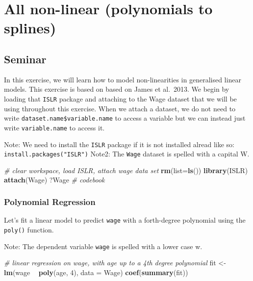 \documentclass[]{article}
\newenvironment{Shaded}{\begin{snugshade}}{\end{snugshade}}
\newcommand{\CommentTok}[1]{\textcolor[rgb]{0.56,0.35,0.01}{\textit{#1}}}
\newcommand{\DataTypeTok}[1]{\textcolor[rgb]{0.13,0.29,0.53}{#1}}
\newcommand{\DecValTok}[1]{\textcolor[rgb]{0.00,0.00,0.81}{#1}}
\newcommand{\KeywordTok}[1]{\textcolor[rgb]{0.13,0.29,0.53}{\textbf{#1}}}
\newcommand{\NormalTok}[1]{#1}
\newcommand{\OperatorTok}[1]{\textcolor[rgb]{0.81,0.36,0.00}{\textbf{#1}}}
\newcommand{\StringTok}[1]{\textcolor[rgb]{0.31,0.60,0.02}{#1}}
\begin{document}
\hypertarget{all-non-linear-polynomials-to-splines}{%
\section{All non-linear (polynomials to splines)}\label{all-non-linear-polynomials-to-splines}}

\hypertarget{seminar-4}{%
\subsection{Seminar}\label{seminar-4}}

In this exercise, we will learn how to model non-linearities in generalised linear models. This exercise is based on based on James et al.~2013. We begin by loading that \texttt{ISLR} package and attaching to the Wage dataset that we will be using throughout this exercise. When we attach a dataset, we do not need to write \texttt{dataset.name\$variable.name} to access a variable but we can instead just write \texttt{variable.name} to access it.

Note: We need to install the \texttt{ISLR} package if it is not installed alread like so: \texttt{install.packages("ISLR")}
Note2: The \texttt{Wage} dataset is spelled with a capital W.

\begin{Shaded}
\begin{Highlighting}[]
\CommentTok{# clear workspace, load ISLR, attach wage data set}
\KeywordTok{rm}\NormalTok{(}\DataTypeTok{list=}\KeywordTok{ls}\NormalTok{())}
\KeywordTok{library}\NormalTok{(ISLR)}
\KeywordTok{attach}\NormalTok{(Wage)}
\NormalTok{?Wage }\CommentTok{# codebook}
\end{Highlighting}
\end{Shaded}

\hypertarget{polynomial-regression}{%
\subsubsection{Polynomial Regression}\label{polynomial-regression}}

Let's fit a linear model to predict \texttt{wage} with a forth-degree polynomial using the \texttt{poly()} function.

Note: The dependent variable \texttt{wage} is spelled with a lower case w.

\begin{Shaded}
\begin{Highlighting}[]
\CommentTok{# linear regression on wage, with age up to a 4th degree polynomial}
\NormalTok{fit <-}\StringTok{ }\KeywordTok{lm}\NormalTok{(wage }\OperatorTok{~}\StringTok{ }\KeywordTok{poly}\NormalTok{(age, }\DecValTok{4}\NormalTok{), }\DataTypeTok{data =}\NormalTok{ Wage)}
\KeywordTok{coef}\NormalTok{(}\KeywordTok{summary}\NormalTok{(fit))}
\end{Highlighting}
\end{Shaded}
\end{document}
